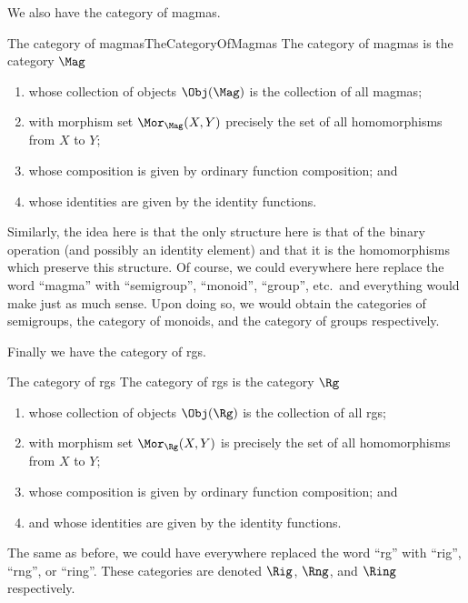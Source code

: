 We also have the category of magmas.
\begin{exm}{The category of magmas}{TheCategoryOfMagmas}
The category of magmas is the category $\Mag$\index[notation]{$\Mag$}
\begin{enumerate}
\item whose collection of objects $\Obj (\Mag )$ is the collection of all magmas;
\item with morphism set $\Mor _{\Mag}(X,Y)$ precisely the set of all homomorphisms from $X$ to $Y$;
\item whose composition is given by ordinary function composition; and
\item whose identities are given by the identity functions.
\end{enumerate}
\end{exm}
Similarly, the idea here is that the only structure here is that of the binary operation (and possibly an identity element) and that it is the homomorphisms which preserve this structure.  Of course, we could everywhere here replace the word ``magma'' with ``semigroup'', ``monoid'', ``group'', etc.~and everything would make just as much sense.  Upon doing so, we would obtain the categories of semigroups, the category of monoids, and the category of groups respectively.

Finally we have the category of rgs.
\begin{exm}{The category of rgs}{}
The category of rgs is the category $\Rg$\index[notation]{$\Rg$}
\begin{enumerate}
\item whose collection of objects $\Obj (\Rg )$ is the collection of all rgs;
\item with morphism set $\Mor _{\Rg}(X,Y)$ is precisely the set of all homomorphisms from $X$ to $Y$;
\item whose composition is given by ordinary function composition; and
\item and whose identities are given by the identity functions.
\end{enumerate}
\begin{rmk}
The same as before, we could have everywhere replaced the word ``rg'' with ``rig'', ``rng'', or ``ring''.  These categories are denoted $\Rig$\index[notation]{$\Rig$}, $\Rng$\index[notation]{$\Rng$}, and $\Ring$\index[notation]{$\Ring$} respectively.
\end{rmk}
\end{exm}

